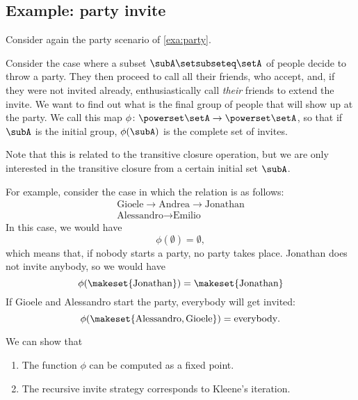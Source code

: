 \subsection{Example: party invite}

Consider again the party scenario of \cref{exa:party}.

Consider the case where a subset $\subA \setsubseteq \setA$ of people decide to throw a party.
They then proceed to call all their friends, who accept, and,
if they were not invited already, enthusiastically call \emph{their} friends to extend the invite.
We want to find out what is the final group of people that will show up at the party.
We call this map $\phi \colon \powerset \setA \to \powerset \setA$, so that
if $\subA$ is the initial group, $\phi(\subA)$ is the complete set of invites.

Note that this is related to the transitive closure operation, but we are only interested in the transitive closure from a certain initial set $\subA$.

For example, consider the case in which the relation is as follows:
\begin{align}
    \text{Gioele} \to \text{Andrea} \to \text{Jonathan} \\
    \text{Alessandro} \to \text{Emilio}
\end{align}
In this case, we would have
\begin{equation}
    \phi(\emptyset) = \emptyset,
\end{equation}
which means that, if nobody starts a party, no party takes place.
Jonathan does not invite anybody, so we would have
\begin{equation}
    \phi(\makeset{\text{Jonathan}}) = \makeset{\text{Jonathan}}
\end{equation}
If Gioele and Alessandro start the party, everybody will get invited:
\begin{equation}
    \phi(\makeset{\text{Alessandro}, \text{Gioele}}) = \text{everybody}.
\end{equation}

We can show that
\begin{enumerate}
    \item The function $\phi$ can be computed as a fixed point.
    \item The recursive invite strategy corresponds to Kleene's iteration.
\end{enumerate}

